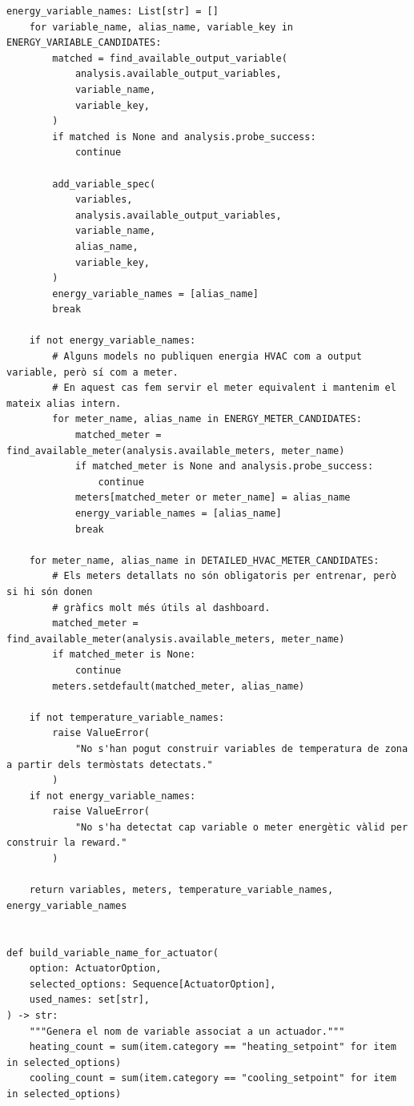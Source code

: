 \documentclass[10pt,a4paper]{article}
\begin{document}
\begin{lstlisting}[style=studioPython,caption={backend/afegir\_entorn\_config.py},label={lst:backend-afegir-entorn-config-py}]
    energy_variable_names: List[str] = []
    for variable_name, alias_name, variable_key in ENERGY_VARIABLE_CANDIDATES:
        matched = find_available_output_variable(
            analysis.available_output_variables,
            variable_name,
            variable_key,
        )
        if matched is None and analysis.probe_success:
            continue

        add_variable_spec(
            variables,
            analysis.available_output_variables,
            variable_name,
            alias_name,
            variable_key,
        )
        energy_variable_names = [alias_name]
        break

    if not energy_variable_names:
        # Alguns models no publiquen energia HVAC com a output variable, però sí com a meter.
        # En aquest cas fem servir el meter equivalent i mantenim el mateix alias intern.
        for meter_name, alias_name in ENERGY_METER_CANDIDATES:
            matched_meter = find_available_meter(analysis.available_meters, meter_name)
            if matched_meter is None and analysis.probe_success:
                continue
            meters[matched_meter or meter_name] = alias_name
            energy_variable_names = [alias_name]
            break

    for meter_name, alias_name in DETAILED_HVAC_METER_CANDIDATES:
        # Els meters detallats no són obligatoris per entrenar, però si hi són donen
        # gràfics molt més útils al dashboard.
        matched_meter = find_available_meter(analysis.available_meters, meter_name)
        if matched_meter is None:
            continue
        meters.setdefault(matched_meter, alias_name)

    if not temperature_variable_names:
        raise ValueError(
            "No s'han pogut construir variables de temperatura de zona a partir dels termòstats detectats."
        )
    if not energy_variable_names:
        raise ValueError(
            "No s'ha detectat cap variable o meter energètic vàlid per construir la reward."
        )

    return variables, meters, temperature_variable_names, energy_variable_names


def build_variable_name_for_actuator(
    option: ActuatorOption,
    selected_options: Sequence[ActuatorOption],
    used_names: set[str],
) -> str:
    """Genera el nom de variable associat a un actuador."""
    heating_count = sum(item.category == "heating_setpoint" for item in selected_options)
    cooling_count = sum(item.category == "cooling_setpoint" for item in selected_options)


\end{lstlisting}
\end{document}
